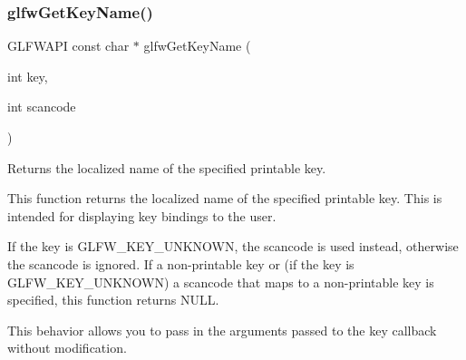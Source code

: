 \subsubsection{\texorpdfstring{glfw\+Get\+Key\+Name()}{glfwGetKeyName()}}
{\footnotesize\ttfamily G\+L\+F\+W\+A\+PI const char $\ast$ glfw\+Get\+Key\+Name (\begin{DoxyParamCaption}\item[{int}]{key,  }\item[{int}]{scancode }\end{DoxyParamCaption})}



Returns the localized name of the specified printable key. 

This function returns the localized name of the specified printable key. This is intended for displaying key bindings to the user.

If the key is {\ttfamily G\+L\+F\+W\+\_\+\+K\+E\+Y\+\_\+\+U\+N\+K\+N\+O\+WN}, the scancode is used instead, otherwise the scancode is ignored. If a non-\/printable key or (if the key is {\ttfamily G\+L\+F\+W\+\_\+\+K\+E\+Y\+\_\+\+U\+N\+K\+N\+O\+WN}) a scancode that maps to a non-\/printable key is specified, this function returns {\ttfamily N\+U\+LL}.

This behavior allows you to pass in the arguments passed to the key callback without modification.

